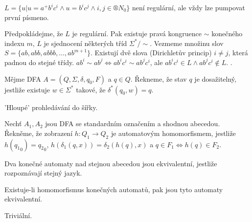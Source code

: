\documentclass[12pt]{article}                   %
\begin{document}
    \begin{priklad}
        $L = \{u | u = a^+b^ic^i \land u = b^ic^j \land i, j \in ®N_0\}$ není regulární, ale vždy lze pumpovat první písmeno.

        \begin{dukazin}[Sporem]
            Předpokládejme, že $L$ je regulární. Pak existuje pravá kongruence $\sim$ konečného indexu $m$, $L$ je sjednocení některých tříd $\Sigma^* / \sim$. Vezmeme množinu slov $S = \{ab, abb, abbb, …, ab^{m+1}\}$. Existují dvě slova (Dirichletův princip) $i ≠ j$, která padnou do stejné třídy. $ab^i \sim ab^j \Leftrightarrow ab^ic^i \sim ab^jc^i$, ale $ab^ic^i \in L \land ab^jc^i \notin L$. \lightning.
        \end{dukazin}
    \end{priklad}

    \begin{definice}
        Mějme DFA $A = (Q, \Sigma, \delta, q_0, F)$ a $q \in Q$. Řekneme, že stav $q$ je dosažitelný, jestliže existuje $w \in \Sigma^*$ takové, že $\delta^*(q_0, w) = q$.

        \begin{poznamka}
            'Hloupé' prohledávání do šířky.
        \end{poznamka}
    \end{definice}

    \begin{definice}
        Nechť $A_1, A_2$ jsou DFA se standardním označením a shodnou abecedou. Řekněme, že zobrazení $h: Q_1 \rightarrow Q_2$ je automatovým homomorfismem, jestliže $h({q_1}_0) = {q_2}_0$, $h(\delta_1(q, x)) = \delta_2(h(q), x)$ a $q \in F_1 \Leftrightarrow h(q) \in F_2$.
    \end{definice}

    \begin{definice}
        Dva konečné automaty nad stejnou abecedou jsou ekvivalentní, jestliže rozpoznávají stejný jazyk.
    \end{definice}

    \begin{veta}
        Existuje-li homomorfismus konečných automatů, pak jsou tyto automaty ekvivalentní.

        \begin{dukazin}
            Triviální.
        \end{dukazin}
    \end{veta}
\end{document}
